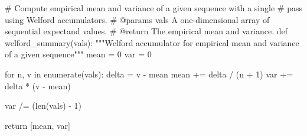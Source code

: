 \documentclass[
  letterpaper,
  DIV=11,
  numbers=noendperiod]{scrartcl}
\newenvironment{Shaded}{\begin{snugshade}}{\end{snugshade}}
\newcommand{\BuiltInTok}[1]{\textcolor[rgb]{0.00,0.23,0.31}{#1}}
\newcommand{\CommentTok}[1]{\textcolor[rgb]{0.37,0.37,0.37}{#1}}
\newcommand{\ControlFlowTok}[1]{\textcolor[rgb]{0.00,0.23,0.31}{#1}}
\newcommand{\DecValTok}[1]{\textcolor[rgb]{0.68,0.00,0.00}{#1}}
\newcommand{\KeywordTok}[1]{\textcolor[rgb]{0.00,0.23,0.31}{#1}}
\newcommand{\NormalTok}[1]{\textcolor[rgb]{0.00,0.23,0.31}{#1}}
\newcommand{\OperatorTok}[1]{\textcolor[rgb]{0.37,0.37,0.37}{#1}}
\begin{document}
\begin{Shaded}
\begin{Highlighting}[]
\CommentTok{\# Compute empirical mean and variance of a given sequence with a single}
\CommentTok{\# pass using Welford accumulators.}
\CommentTok{\# @params vals A one{-}dimensional array of sequential expectand values.}
\CommentTok{\# @return The empirical mean and variance.}
\KeywordTok{def}\NormalTok{ welford\_summary(vals):}
  \CommentTok{"""Welford accumulator for empirical mean and variance of a}
\CommentTok{     given sequence"""}
\NormalTok{  mean }\OperatorTok{=} \DecValTok{0}
\NormalTok{  var }\OperatorTok{=} \DecValTok{0}
  
  \ControlFlowTok{for}\NormalTok{ n, v }\KeywordTok{in} \BuiltInTok{enumerate}\NormalTok{(vals):}
\NormalTok{    delta }\OperatorTok{=}\NormalTok{ v }\OperatorTok{{-}}\NormalTok{ mean}
\NormalTok{    mean }\OperatorTok{+=}\NormalTok{ delta }\OperatorTok{/}\NormalTok{ (n }\OperatorTok{+} \DecValTok{1}\NormalTok{)}
\NormalTok{    var }\OperatorTok{+=}\NormalTok{ delta }\OperatorTok{*}\NormalTok{ (v }\OperatorTok{{-}}\NormalTok{ mean)}
    
\NormalTok{  var }\OperatorTok{/=}\NormalTok{ (}\BuiltInTok{len}\NormalTok{(vals) }\OperatorTok{{-}} \DecValTok{1}\NormalTok{)}
  
  \ControlFlowTok{return}\NormalTok{ [mean, var]}
\end{Highlighting}
\end{Shaded}
\end{document}
